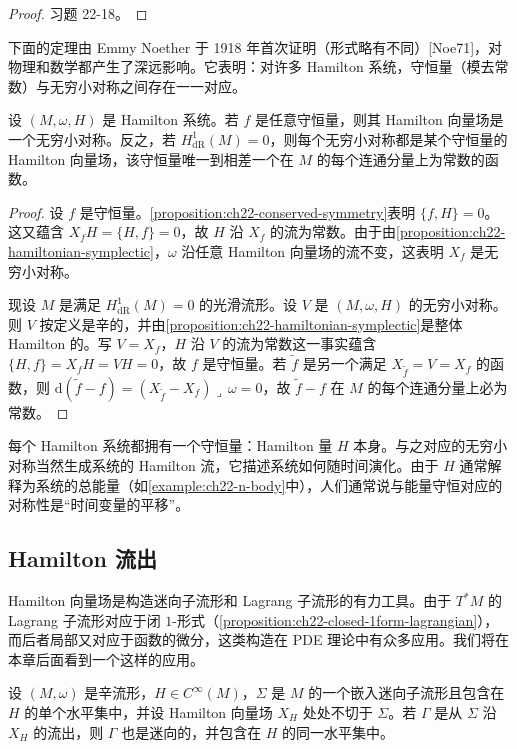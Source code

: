 \documentclass[../../main.tex]{subfiles}
\begin{document}
\begin{proof}
习题 22-18。
\end{proof}

下面的定理由 Emmy Noether 于 1918 年首次证明（形式略有不同）[Noe71]，对物理和数学都产生了深远影响。它表明：对许多 Hamilton 系统，守恒量（模去常数）与无穷小对称之间存在一一对应。

\begin{theorem}[Noether 定理]\label{theorem:ch22-noether}
设 $(M,\omega,H)$ 是 Hamilton 系统。若 $f$ 是任意守恒量，则其 Hamilton 向量场是一个无穷小对称。反之，若 $H^1_{\mathrm{dR}}(M)=0$，则每个无穷小对称都是某个守恒量的 Hamilton 向量场，该守恒量唯一到相差一个在 $M$ 的每个连通分量上为常数的函数。
\end{theorem}

\begin{proof}
设 $f$ 是守恒量。\cref{proposition:ch22-conserved-symmetry}表明 $\{f,H\}=0$。这又蕴含 $X_f H=\{H,f\}=0$，故 $H$ 沿 $X_f$ 的流为常数。由于由\cref{proposition:ch22-hamiltonian-symplectic}，$\omega$ 沿任意 Hamilton 向量场的流不变，这表明 $X_f$ 是无穷小对称。

现设 $M$ 是满足 $H^1_{\mathrm{dR}}(M)=0$ 的光滑流形。设 $V$ 是 $(M,\omega,H)$ 的无穷小对称。则 $V$ 按定义是辛的，并由\cref{proposition:ch22-hamiltonian-symplectic}是整体 Hamilton 的。写 $V=X_f$，$H$ 沿 $V$ 的流为常数这一事实蕴含 $\{H,f\}=X_f H=VH=0$，故 $f$ 是守恒量。若 $\widetilde f$ 是另一个满足 $X_{\widetilde f}=V=X_f$ 的函数，则 $\mathrm{d}(\widetilde f-f)=(X_{\widetilde f}-X_f)\lrcorner\,\omega=0$，故 $\widetilde f-f$ 在 $M$ 的每个连通分量上必为常数。
\end{proof}

每个 Hamilton 系统都拥有一个守恒量：Hamilton 量 $H$ 本身。与之对应的无穷小对称当然生成系统的 Hamilton 流，它描述系统如何随时间演化。由于 $H$ 通常解释为系统的总能量（如\cref{example:ch22-n-body}中），人们通常说与能量守恒对应的对称性是“时间变量的平移”。

\subsection*{Hamilton 流出}

Hamilton 向量场是构造迷向子流形和 Lagrang 子流形的有力工具。由于 $T^*M$ 的 Lagrang 子流形对应于闭 $1$-形式（\cref{proposition:ch22-closed-1form-lagrangian}），而后者局部又对应于函数的微分，这类构造在 PDE 理论中有众多应用。我们将在本章后面看到一个这样的应用。

\begin{theorem}\label{theorem:ch22-hamiltonian-flowout}
设 $(M,\omega)$ 是辛流形，$H\in C^\infty(M)$，$\Sigma$ 是 $M$ 的一个嵌入迷向子流形且包含在 $H$ 的单个水平集中，并设 Hamilton 向量场 $X_H$ 处处不切于 $\Sigma$。若 $\Gamma$ 是从 $\Sigma$ 沿 $X_H$ 的流出，则 $\Gamma$ 也是迷向的，并包含在 $H$ 的同一水平集中。
\end{theorem}
\end{document}
